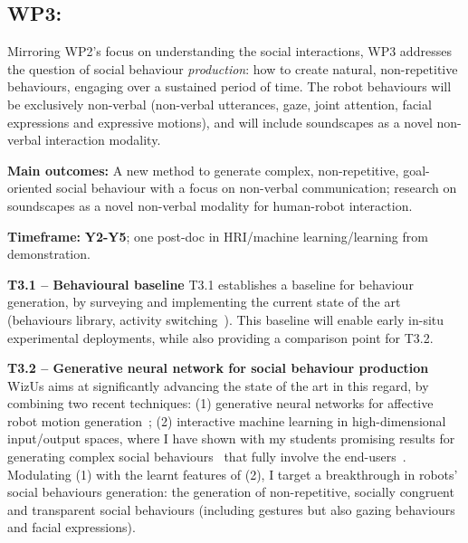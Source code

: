 \documentclass[11pt,a4paper]{report}
\newcommand{\project}{WizUs\xspace}
\begin{document}
\subsection{WP3: \textbf{\wpThree}} 

Mirroring WP2's focus on understanding the social interactions, WP3 addresses the
question of social behaviour \emph{production}: how to create natural,
non-repetitive behaviours, engaging over a sustained period of time. The robot
behaviours will be exclusively non-verbal (non-verbal utterances, gaze, joint
attention, facial expressions and expressive motions), and will include
soundscapes as a novel non-verbal interaction modality.

\begin{framed}

    \textbf{Main outcomes:} A new method to generate complex, non-repetitive,
    goal-oriented social behaviour with a focus on non-verbal communication;
    research on soundscapes as a novel non-verbal modality for human-robot
    interaction.

    \textbf{Timeframe:} \textbf{Y2-Y5}; one post-doc in HRI/machine learning/learning from
demonstration.

\end{framed}

\textbf{T3.1 -- Behavioural baseline} T3.1 establishes a baseline for behaviour
generation, by surveying and implementing the current state of the art
(behaviours library, activity switching~\cite{coninx2016towards}). This
baseline will enable early in-situ experimental deployments, while also
providing a comparison point for T3.2.

\textbf{T3.2 -- Generative neural network for social behaviour production}
\project aims at significantly advancing the state of the art in this regard, by
combining two recent techniques: (1) generative neural networks for affective
robot motion generation~\cite{marmpena2019generating,suguitan2020moveae}; (2) interactive machine
learning in high-dimensional input/output spaces, where I have shown with my
students promising results for generating complex social
behaviours~\cite{senft2019teaching, winkle2020couch} that fully involve the
end-users~\cite{winkle2018social}. Modulating (1) with the learnt features of
(2), I target a breakthrough in robots' social behaviours generation: the
generation of non-repetitive, socially congruent and transparent social
behaviours (including gestures but also gazing behaviours and facial
expressions).
\end{document}
